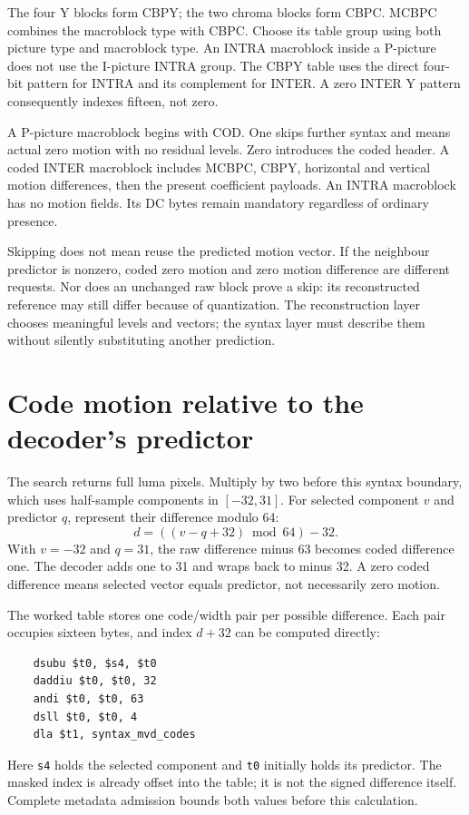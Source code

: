 The four Y blocks form CBPY; the two chroma blocks form CBPC. MCBPC combines
the macroblock type with CBPC. Choose its table group using both picture type
and macroblock type. An INTRA macroblock inside a P-picture does not use the
I-picture INTRA group. The CBPY table uses the direct four-bit pattern for
INTRA and its complement for INTER. A zero INTER Y pattern consequently indexes
fifteen, not zero.

A P-picture macroblock begins with COD. One skips further syntax and means
actual zero motion with no residual levels. Zero introduces the coded header.
A coded INTER macroblock includes MCBPC, CBPY, horizontal and vertical motion
differences, then the present coefficient payloads. An INTRA macroblock has no
motion fields. Its DC bytes remain mandatory regardless of ordinary presence.

Skipping does not mean reuse the predicted motion vector. If the neighbour
predictor is nonzero, coded zero motion and zero motion difference are different
requests. Nor does an unchanged raw block prove a skip: its reconstructed
reference may still differ because of quantization. The reconstruction layer
chooses meaningful levels and vectors; the syntax layer must describe them
without silently substituting another prediction.

\section{Code motion relative to the decoder's predictor}

The search returns full luma pixels. Multiply by two before this syntax boundary,
which uses half-sample components in $[-32,31]$. For selected component $v$ and
predictor $q$, represent their difference modulo 64:
\[
  d=((v-q+32)\bmod64)-32.
\]
With $v=-32$ and $q=31$, the raw difference minus 63 becomes coded difference
one. The decoder adds one to 31 and wraps back to minus 32. A zero coded
difference means selected vector equals predictor, not necessarily zero motion.

The worked table stores one code/width pair per possible difference. Each pair
occupies sixteen bytes, and index $d+32$ can be computed directly:
\begin{verbatim}
    dsubu $t0, $s4, $t0
    daddiu $t0, $t0, 32
    andi $t0, $t0, 63
    dsll $t0, $t0, 4
    dla $t1, syntax_mvd_codes
\end{verbatim}
Here \texttt{s4} holds the selected component and \texttt{t0} initially holds
its predictor. The masked index is already offset into the table; it is not
the signed difference itself. Complete metadata admission bounds both values
before this calculation.

